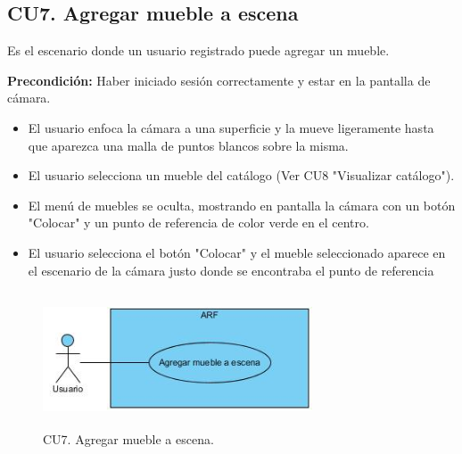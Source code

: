 \subsection{CU7. Agregar mueble a escena}\par
Es el escenario donde un usuario registrado puede agregar un mueble.\par
\textbf{Precondición:} Haber iniciado sesión correctamente y estar en la pantalla de cámara.\par
\begin{itemize}
	\item El usuario enfoca la cámara a una superficie y la mueve ligeramente hasta que aparezca una malla de puntos blancos sobre la misma.
	\item El usuario selecciona un mueble del catálogo (Ver CU8 "Visualizar catálogo").
	\item El menú de muebles se oculta, mostrando en pantalla la cámara con un botón "Colocar" y un punto de referencia de color verde en el centro.
	\item El usuario selecciona el botón "Colocar" y el mueble seleccionado aparece en el escenario de la cámara justo donde se encontraba el punto de referencia
\end{itemize}

\begin{figure}[h!]
	\centering
	\includegraphics[width=8cm,height=4cm]{imagenes/analisis/cu/agregar_mueble.jpg}
	\caption{CU7. Agregar mueble a escena.}
	\label{fig:agregarmueble}
\end{figure} 

